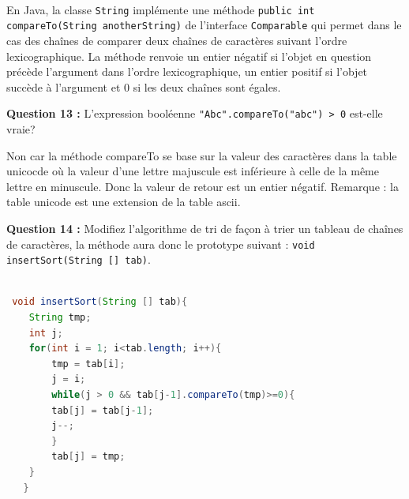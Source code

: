 \documentclass[iutinfo,a4paper,nocorrections,10pt]{ustl-tdtp}
\begin{document}
\paragraph{} 
 
En Java, la classe \texttt{String} implémente une méthode \texttt{public int compareTo(String anotherString)} de l'interface \texttt{Comparable} qui permet dans le cas des chaînes de comparer deux chaînes de caractères suivant l'ordre lexicographique. La méthode renvoie un entier négatif si l'objet en question précède l'argument dans l'ordre lexicographique, un entier positif si l'objet succède à l'argument et 0 si les deux chaînes sont égales.\newline
 
\textbf{Question 13 :}
L'expression booléenne \texttt{"Abc".compareTo("abc") > 0} est-elle
vraie? 
\begin{correction} {\color{red}Non car la méthode compareTo se base
    sur la valeur des caractères dans la table unicocde où la valeur
    d'une lettre majuscule est inférieure à celle de la même lettre en
    minuscule. Donc la valeur de retour est un entier négatif.
    Remarque : la table unicode est une extension de la table
    ascii.}
\end{correction}

\textbf{Question 14 :} Modifiez l'algorithme de tri de façon à trier un tableau de chaînes de caractères, la méthode aura donc le prototype suivant : \texttt{void insertSort(String [] tab)}.

\begin{correction}


{\color{red}

\begin{lstlisting}[language=java]

 void insertSort(String [] tab){
	String tmp;	
	int j;
	for(int i = 1; i<tab.length; i++){
	    tmp = tab[i];
	    j = i;
	    while(j > 0 && tab[j-1].compareTo(tmp)>=0){
		tab[j] = tab[j-1];
		j--;
	    }
	    tab[j] = tmp;
	}
   }
    
\end{lstlisting}

}
\end{correction}
\end{document}
